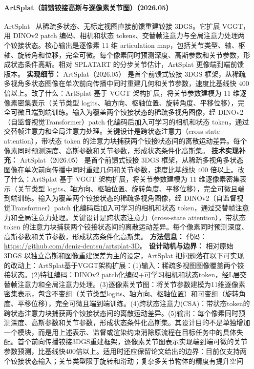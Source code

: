 \paragraph{ArtSplat（前馈铰接高斯与逐像素关节图）（2026.05）}
ArtSplat~\cite{2605_24304} 从稀疏多状态、无标定视图直接前馈重建铰接 3DGS。它扩展 VGGT，用 DINOv2 patch 编码、相机和状态 tokens、交替帧注意力与全局注意力处理两个铰接状态。核心输出是逐像素 11 维 articulation map，包括关节类型、轴、枢轴、旋转角和位移，完全可微。每个像素同时预测深度、高斯参数和关节参数，形成状态条件高斯。相对 SPLATART 的分步关节估计，ArtSplat 更像端到端前馈版本。
\textbf{实现细节：} ArtSplat（2026.05） 是首个前馈式铰接 3DGS 框架，从稀疏多视角多状态图像在单次前向传播中同时重建几何和关节参数，速度比基线快 400 倍以上。改了什么：ArtSplat 基于 VGGT 架构扩展，将关节参数建模为 11 维逐像素密集表示（关节类型 logits、轴方向、枢轴位置、旋转角度、平移位移），完全可微且端到端训练。输入为覆盖两个铰接状态的稀疏多视角图像，经 DINOv2（自监督视觉Transformer）patch 化编码后加入可学习的相机和状态 token，通过交替帧注意力和全局注意力处理。关键设计是跨状态注意力（cross-state attention），带状态 token 的注意力块捕获两个铰接状态间的离散运动差异。每个像素同时预测深度、高斯参数和关节参数，形成状态条件化高斯集。
\textbf{技术实现补充：} ArtSplat（2026.05） 是首个前馈式铰接 3DGS 框架，从稀疏多视角多状态图像在单次前向传播中同时重建几何和关节参数，速度比基线快 400 倍以上。改了什么：ArtSplat 基于 VGGT 架构扩展，将关节参数建模为 11 维逐像素密集表示（关节类型 logits、轴方向、枢轴位置、旋转角度、平移位移），完全可微且端到端训练。输入为覆盖两个铰接状态的稀疏多视角图像，经 DINOv2（自监督视觉Transformer）patch 化编码后加入可学习的相机和状态 token，通过交替帧注意力和全局注意力处理。关键设计是跨状态注意力（cross-state attention），带状态 token 的注意力块捕获两个铰接状态间的离散运动差异。每个像素同时预测深度、高斯参数和关节参数，形成状态条件化高斯集。
\textbf{方法信息：} 代码：\url{https://github.com/deniz-dentsu/artsplat-3D}。
\textbf{设计动机与边界：} 相对原始 3DGS 以独立高斯和图像重建误差为主的设定，ArtSplat 把问题落在以下可实现的改动上：ArtSplat基于VGGT架构扩展：(1)输入：稀疏多视图图像覆盖两个铰接状态。(2)特征编码：DINOv2 patch化编码+可学习相机和状态token，经L层交替帧注意力和全局注意力处理。(3)逐像素关节图：将关节参数建模为11维逐像素密集表示，包含不变组（关节类型logits、轴方向、枢轴位置）和可变组（旋转角度、平移位移），完全可微且端到端训练。(4)跨状态注意力(CSA)：带状态token的跨状态注意力块捕获两个铰接状态间的离散运动差异。(5)输出：每个像素同时预测深度、高斯参数和关节参数，形成状态条件化高斯集。其设计目的不是单独增加一个模块，而是用上述表示、监督或渲染约束消除原流程在目标任务中的具体失配。首个前向传播铰接3DGS重建框架，逐像素关节图表示实现端到端可微的关节参数预测，比基线快400倍以上。适用时还应保留论文给出的边界：目前仅支持两个铰接状态输入；关节类型限于旋转和滑动；复杂多关节物体的精度有提升空间

